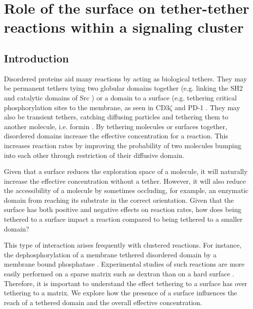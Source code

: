 \documentclass[../../AdvancementSummary.tex]{subfiles}
\begin{document}
\section{Role of the surface on tether-tether reactions within a signaling cluster}

\subsection{Introduction}

Disordered proteins aid many reactions by acting as biological tethers. They may be permanent tethers tying two globular domains together (e.g. linking the SH2 and catalytic domains of Src \cite{Gonfloni1997}) or a domain to a surface (e.g. tethering critical phosphorylation sites to the membrane, as seen in CD3$\zeta$ and PD-1 \cite{Smith-Garvin2009, Keir2008}. They may also be transient tethers, catching diffusing particles and tethering them to another molecule, i.e. formin \cite{Vavylonis2006, Bryant2017}. By tethering molecules or surfaces together, disordered domains increase the effective concentration for a reaction. This increases reaction rates by improving the probability of two molecules bumping into each other through restriction of their diffusive domain.

Given that a surface reduces the exploration space of a molecule, it will naturally increase the effective concentration without a tether. However, it will also reduce the accessibility of a molecule by sometimes occluding, for example, an enzymatic domain from reaching its substrate in the correct orientation. Given that the surface has both positive and negative effects on reaction rates, how does being tethered to a surface impact a reaction compared to being tethered to a smaller domain? 

This type of interaction arises frequently with clustered reactions. For instance, the dephosphorylation of a membrane tethered disordered domain by a membrane bound phosphatase \cite{Yokosuka2012}. Experimental studies of such reactions are more easily performed on a sparse matrix such as dextran than on a hard surface \cite{Goyette2017}. Therefore, it is important to understand the effect tethering to a surface has over tethering to a matrix. We explore how the presence of a surface influences the reach of a tethered domain and the overall effective concentration.
\end{document}
